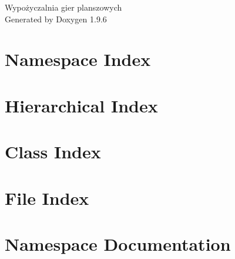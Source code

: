 \documentclass[twoside]{book}
\newcommand{\+}{\discretionary{\mbox{\scriptsize$\hookleftarrow$}}{}{}}
\newcommand{\clearemptydoublepage}{%
    \newpage{\pagestyle{empty}\cleardoublepage}%
  }
\begin{document}
  \raggedbottom
    \hypersetup{pageanchor=false,
                bookmarksnumbered=true,
                pdfencoding=unicode
               }
  \begin{titlepage}
  \vspace*{7cm}
  \begin{center}%
  {\Large Wypożyczalnia gier planszowych}\\
  \vspace*{1cm}
  {\large Generated by Doxygen 1.9.6}\\
  \end{center}
  \end{titlepage}
  \clearemptydoublepage
  \tableofcontents
  \clearemptydoublepage
  \hypersetup{pageanchor=true}
\chapter{Namespace Index}

\chapter{Hierarchical Index}

\chapter{Class Index}

\chapter{File Index}

\chapter{Namespace Documentation}




\end{document}

